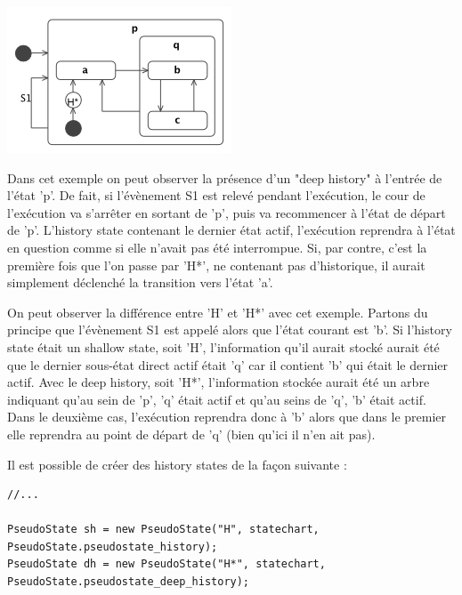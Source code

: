 \documentclass[french, 12pt, a4paper]{article}
\begin{document}
        \begin{center}
			\captionsetup{type=figure}
			\includegraphics[scale=1]{Images/History_state.png}
	    \end{center}

        Dans cet exemple on peut observer la présence d'un "deep history" à l'entrée de l'état 'p'. De fait, si l'évènement S1 est relevé pendant l'exécution, le cour de l'exécution va s'arrêter en sortant de 'p', puis va recommencer à l'état de départ de 'p'. L'history state contenant le dernier état actif, l'exécution reprendra à l'état en question comme si elle n'avait pas été interrompue. Si, par contre, c'est la première fois que l'on passe par 'H*', ne contenant pas d'historique, il aurait simplement déclenché la transition vers l'état 'a'.
        
        On peut observer la différence entre 'H' et 'H*' avec cet exemple. Partons du principe que l'évènement S1 est appelé alors que l'état courant est 'b'. Si l'history state était un shallow state, soit 'H', l'information qu'il aurait stocké aurait été que le dernier sous-état direct actif était 'q' car il contient 'b' qui était le dernier actif. Avec le deep history, soit 'H*', l'information stockée aurait été un arbre indiquant qu'au sein de 'p', 'q' était actif et qu'au seins de 'q', 'b' était actif. Dans le deuxième cas, l'exécution reprendra donc à 'b' alors que dans le premier elle reprendra au point de départ de 'q' (bien qu'ici il n'en ait pas).
        \bigskip
        
        Il est possible de créer des history states de la façon suivante :
        
        \begin{lstlisting}[basicstyle=\small]
        //...

PseudoState sh = new PseudoState("H", statechart, PseudoState.pseudostate_history);
PseudoState dh = new PseudoState("H*", statechart, PseudoState.pseudostate_deep_history);

        \end{lstlisting}
        
\end{document}
